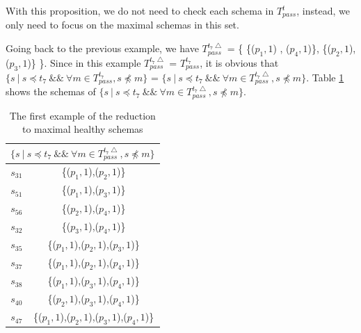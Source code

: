 With this proposition, we do not need to check each schema in $T_{pass}^{t}$, instead, we only need to focus on the maximal schemas in this set.


Going back to the previous example, we have $T_{pass}^{t_{7}\bigtriangleup}$ = \{ \{($p_{1}, 1$) , ($p_{4}, 1$)\}, \{($p_{2}, 1$), ($p_{3}, 1$)\} \}. Since in this example  $T_{pass}^{t_{7}\bigtriangleup}$ =  $T_{pass}^{t_{7}}$, it is obvious that  $\{ s\ |\ s \preceq t_{7}\ \&\&\ \forall m \in T_{pass}^{t_{7}}, s \npreceq m \}$ =  $\{ s\ |\ s \preceq t_{7}\ \&\&\ \forall m \in T_{pass}^{t_{7}\bigtriangleup}, s \npreceq m \}$.   Table \ref{ex:maximalhealthyintequal} shows the schemas of $\{ s\ |\ s \preceq t_{7}\ \&\&\ \forall m \in T_{pass}^{t_{7}\bigtriangleup}, s \npreceq m \}$.

 \begin{table}[htbp]
  \centering
  \caption{The first example of the reduction to maximal healthy schemas}
  \label{ex:maximalhealthyintequal}
    \begin{tabular}{|c|c|} \hline
     \multicolumn{2}{|c|}{$\{ s\ |\ s \preceq t_{7}\ \&\&\ \forall m \in T_{pass}^{t_{7}\bigtriangleup}, s \npreceq m \}$} \\ \hline
   $s_{31}$ & \{($p_{1}, 1$),($p_{2}, 1$)\} \\
   $s_{51}$ & \{($p_{1}, 1$),($p_{3}, 1$)\} \\
   $s_{56}$ & \{($p_{2}, 1$),($p_{4}, 1$)\} \\
   $s_{32}$ & \{($p_{3}, 1$),($p_{4}, 1$)\} \\

   $s_{35}$ & \{($p_{1}, 1$),($p_{2}, 1$),($p_{3}, 1$)\} \\
   $s_{37}$ & \{($p_{1}, 1$),($p_{2}, 1$),($p_{4}, 1$)\} \\
   $s_{38}$ & \{($p_{1}, 1$),($p_{3}, 1$),($p_{4}, 1$)\} \\
   $s_{40}$ & \{($p_{2}, 1$),($p_{3}, 1$),($p_{4}, 1$)\} \\

   $s_{47}$ & \{($p_{1}, 1$),($p_{2}, 1$),($p_{3}, 1$),($p_{4}, 1$)\} \\ \hline
    \end{tabular}%
  \end{table}


